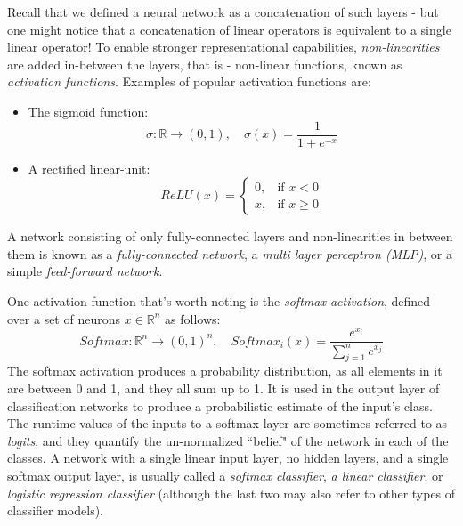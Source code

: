 \documentclass{article}
\begin{document}
\medskip
\noindent
Recall that we defined a neural network as a concatenation of such layers - but one might notice that a concatenation of linear operators is equivalent to a single linear operator! To enable stronger representational capabilities, \emph{non-linearities} are added in-between the layers, that is - non-linear functions, known as \emph{activation functions}. Examples of popular activation functions are:
\begin{itemize}
    \item
        The sigmoid function:
        \begin{equation*}
            \sigma: \mathbb{R} \rightarrow (0,1), \quad \sigma(x) = \frac{1}{1+e^{-x}}
        \end{equation*}
    \item
        A rectified linear-unit:
        \begin{equation*}
            ReLU(x) =
                \begin{cases}
    		      0, & \text{if $x < 0$}\\
                    x, & \text{if $x \geq 0$}
                \end{cases}
        \end{equation*}
\end{itemize}
A network consisting of only fully-connected layers and non-linearities in between them is known as a \emph{fully-connected network}, a \emph{multi layer perceptron (MLP)}, or a simple \emph{feed-forward network}.

\medskip
\noindent
One activation function that's worth noting is the \emph{softmax activation}, defined over a set of neurons $x \in \mathbb{R}^n$ as follows:
\begin{equation*}
    Softmax: \mathbb{R}^n \rightarrow (0,1)^n, \quad Softmax_i(x) = \frac{e^{x_i}}{\sum_{j=1}^{n}{e^{x_j}}}
\end{equation*}
The softmax activation produces a probability distribution, as all elements in it are between 0 and 1, and they all sum up to 1. It is used in the output layer of classification networks to produce a probabilistic estimate of the input's class. The runtime values of the inputs to a softmax layer are sometimes referred to as \emph{logits}, and they quantify the un-normalized ``belief" of the network in each of the classes. A network with a single linear input layer, no hidden layers, and a single softmax output layer, is usually called a \emph{softmax classifier}, \emph{a linear classifier}, or \emph{logistic regression classifier} (although the last two may also refer to other types of classifier models).
\end{document}
